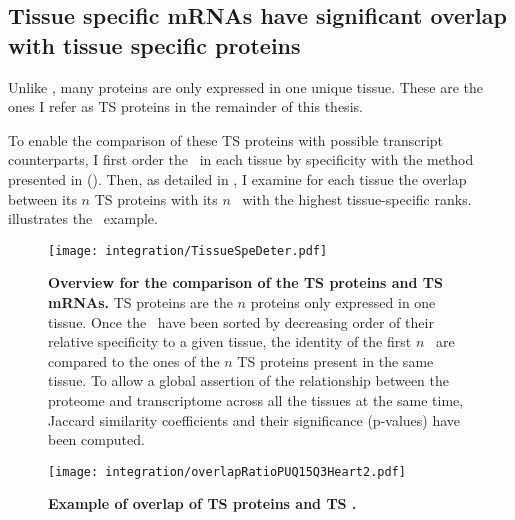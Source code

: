 \subsection{Tissue specific \texorpdfstring{\MakeLowercase{m}RNAs}{mRNAs} %
have significant overlap with tissue specific proteins}\label{sec:TSprotMrna}

Unlike \mRNAs,
many proteins are only expressed in one unique tissue.
These are the ones I refer as \gls{TS} proteins in the remainder of this thesis.

To enable the comparison of these \gls{TS} proteins with possible transcript counterparts,
I first order the \mRNAs\ in each tissue by specificity
with the method presented in 
().
Then, as detailed in ,
I examine for each tissue the overlap between its $n$ \gls{TS} proteins
with its $n$ \mRNAs\ with the highest tissue-specific ranks.
 illustrates the \heart\ example.

\begin{figure}[!htb]
    \texttt{[image: integration/TissueSpeDeter.pdf]}\centering
    \vspace{-3mm}
    \caption[Determination process of the specific mRNAs]{%
    \label{fig:RankSpe}\textbf{Overview for the comparison of the TS proteins
    and TS mRNAs.}
    \gls{TS} proteins are the $n$ proteins only expressed in one tissue.
    Once the \mRNAs\ have been sorted
    by decreasing order of their relative specificity to a given tissue,
    the identity of the first $n$ \mRNAs\ are compared
    to the ones of the $n$ \gls{TS} proteins present in the same tissue.
    To allow a global assertion of the relationship
    between the proteome and transcriptome across
    all the tissues at the same time,
    Jaccard similarity coefficients and their significance (p-values)
    have been computed.
    }
\end{figure}

\begin{figure}[!htbp]
\texttt{[image: integration/overlapRatioPUQ15Q3Heart2.pdf]}\centering
\vspace{-3mm}
    \caption[Example of overlap of TS proteins and TS mRNAs for Heart]{%
    \label{fig:ExJacquard}\textbf{Example of overlap of \gls{TS} proteins
    and \gls{TS} \mRNAs.}}
\end{figure}


